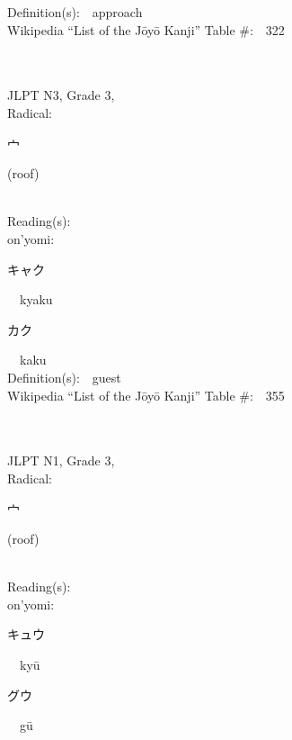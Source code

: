 \begin{multicols}{2}
Definition(s):\ \ approach \\
Wikipedia ``List of the J\=oy\=o Kanji'' Table \#:\ \ 322 \\
\ \ \\
{\fontsize{34pt}{40pt}  }\ \ \\  %
{JLPT N3, Grade 3, \\Radical:\ \ {\begin{CJK}{UTF8}{min} 宀 \end{CJK}} (roof) } \\
Reading(s):\ \ \\
{\hspace*{1em}}on'yomi:\ \ \\
{\hspace*{2em}}{\begin{CJK}{UTF8}{min} キャク \end{CJK}}\ \ kyaku\ \ \\
{\hspace*{2em}}{\begin{CJK}{UTF8}{min} カク \end{CJK}}\ \ kaku\ \ \\
Definition(s):\ \ guest \\
Wikipedia ``List of the J\=oy\=o Kanji'' Table \#:\ \ 355 \\
\ \ \\
{\fontsize{34pt}{40pt}  }\ \ \\  %
{JLPT N1, Grade 3, \\Radical:\ \ {\begin{CJK}{UTF8}{min} 宀 \end{CJK}} (roof) } \\
Reading(s):\ \ \\
{\hspace*{1em}}on'yomi:\ \ \\
{\hspace*{2em}}{\begin{CJK}{UTF8}{min} キュウ \end{CJK}}\ \ ky\=u\ \ \\
{\hspace*{2em}}{\begin{CJK}{UTF8}{min} グウ \end{CJK}}\ \ g\=u\ \ \\

\end{multicols}
